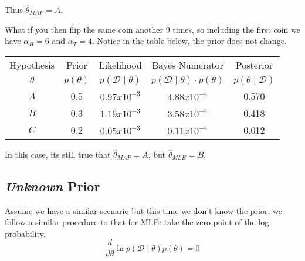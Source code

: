 Thus $\hat\theta_{MAP} = A$. 

What if you then flip the same coin another 9 times, so including the first coin we have 
$\alpha_H=6$ and $\alpha_T=4$.
Notice in the table below, the prior does not change. 

\begin{center}
\begin{tabular}{|c||c|c|c|c|}
\hline
Hypothesis & Prior & Likelihood & Bayes Numerator & Posterior\\
$\theta$ & $p(\theta)$ & $p(\mathcal{D}\mid\theta)$ & $p(\mathcal{D}\mid\theta)\cdot p(\theta)$ & $p(\theta\mid\mathcal{D})$\\
\hline
\hline
$A$	& 0.5		& $0.97x10^{-3}$ & $4.88x10^{-4}$	& 0.570\\
$B$	& 0.3		& $1.19x10^{-3}$ & $3.58x10^{-4}$	& 0.418\\
$C$	& 0.2		& $0.05x10^{-3}$ & $0.11x10^{-4}$	& 0.012\\
\hline
\end{tabular}
\end{center}

In this case, its still true that $\hat\theta_{MAP} = A$,
but $\hat\theta_{MLE} = B$. 


\subsection{\textit{Unknown} Prior}
Assume we have a similar scenario but this time we don't know the prior, 
we follow a similar procedure to that for MLE: 
take the zero point of the log probability. 
\[\frac{d}{d\theta} \ln p(\mathcal{D}\mid\theta)p(\theta) = 0\]

